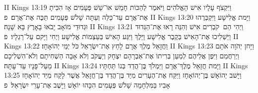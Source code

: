 II Kings 13:19	וַיִּקְצֹף עָלָיו אִישׁ הָאֱלֹהִים וַיֹּאמֶר לְהַכּוֹת חָמֵשׁ אוֹ־שֵׁשׁ פְּעָמִים אָז הִכִּיתָ אֶת־אֲרָם עַד־כַּלֵּה וְעַתָּה שָׁלֹשׁ פְּעָמִים תַּכֶּה אֶת־אֲרָם׃ {פ}
II Kings 13:20	וַיָּמת אֱלִישָׁע וַיִּקְבְּרֻהוּ וּגְדוּדֵי מוֹאָב יָבֹאוּ בָאָרֶץ בָּא שָׁנָה׃
II Kings 13:21	וַיְהִי הֵם  קֹבְרִים אִישׁ וְהִנֵּה רָאוּ אֶת־הַגְּדוּד וַיַּשְׁלִיכוּ אֶת־הָאִישׁ בְּקֶבֶר אֱלִישָׁע וַיֵּלֶךְ וַיִּגַּע הָאִישׁ בְּעַצְמוֹת אֱלִישָׁע וַיְחִי וַיָּקם עַל־רַגְלָיו׃ {פ}
II Kings 13:22	וַחֲזָאֵל מֶלֶךְ אֲרָם לָחַץ אֶת־יִשְׂרָאֵל כֹּל יְמֵי יְהוֹאָחָז׃
II Kings 13:23	וַיָּחן יְהֹוָה אֹתָם וַיְרַחֲמֵם וַיִּפֶן אֲלֵיהֶם לְמַעַן בְּרִיתוֹ אֶת־אַבְרָהָם יִצְחָק וְיַעֲקֹב וְלֹא אָבָה הַשְׁחִיתָם וְלֹא־הִשְׁלִיכָם מֵעַל־פָּנָיו עַד־עָתָּה׃
II Kings 13:24	וַיָּמת חֲזָאֵל מֶלֶךְ־אֲרָם וַיִּמְלֹךְ בֶּן־הֲדַד בְּנוֹ תַּחְתָּיו׃
II Kings 13:25	וַיָּשׁב יְהוֹאָשׁ בֶּן־יְהוֹאָחָז וַיִּקַּח אֶת־הֶעָרִים מִיַּד בֶּן־הֲדַד בֶּן־חֲזָאֵל אֲשֶׁר לָקַח מִיַּד יְהוֹאָחָז אָבִיו בַּמִּלְחָמָה שָׁלֹשׁ פְּעָמִים הִכָּהוּ יוֹאָשׁ וַיָּשֶׁב אֶת־עָרֵי יִשְׂרָאֵל׃ {פ}
